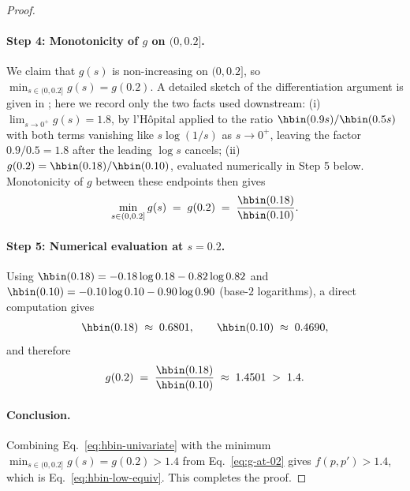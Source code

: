 \begin{proof}
\paragraph{Step 4: Monotonicity of $g$ on $(0, 0.2]$.}
We claim that $g(s)$ is non-increasing on $(0, 0.2]$, so
$\min_{s \in (0, 0.2]} g(s) = g(0.2)$. A detailed sketch of the
differentiation argument is given in ; here we
record only the two facts used downstream:
(i) $\lim_{s \to 0^+} g(s) = 1.8$, by l'H\^opital applied to the
ratio $\hbin(0.9 s)/\hbin(0.5 s)$ with both terms vanishing like
$s \log(1/s)$ as $s \to 0^+$, leaving the factor $0.9/0.5 = 1.8$
after the leading $\log s$ cancels;
(ii) $g(0.2) = \hbin(0.18)/\hbin(0.10)$, evaluated numerically in Step 5
below. Monotonicity of $g$ between these endpoints then gives
\begin{align*}
\min_{s \in (0, 0.2]} g(s) \;=\; g(0.2)
\;=\; \frac{\hbin(0.18)}{\hbin(0.10)}.
\end{align*}

\paragraph{Step 5: Numerical evaluation at $s = 0.2$.}
Using $\hbin(0.18) = -0.18 \log 0.18 - 0.82 \log 0.82$ and
$\hbin(0.10) = -0.10 \log 0.10 - 0.90 \log 0.90$ (base-$2$ logarithms), a
direct computation gives
\begin{align*}
\hbin(0.18) \;\approx\; 0.6801, \qquad
\hbin(0.10) \;\approx\; 0.4690,
\end{align*}
and therefore
\begin{align}\label{eq:g-at-02}
g(0.2) \;=\; \frac{\hbin(0.18)}{\hbin(0.10)} \;\approx\; 1.4501 \;>\; 1.4.
\end{align}

\paragraph{Conclusion.}
Combining Eq.~\eqref{eq:hbin-univariate} with the minimum
$\min_{s \in (0, 0.2]} g(s) = g(0.2) > 1.4$ from
Eq.~\eqref{eq:g-at-02} gives $f(p, p') > 1.4$, which is
Eq.~\eqref{eq:hbin-low-equiv}. This completes the proof.
\end{proof}

